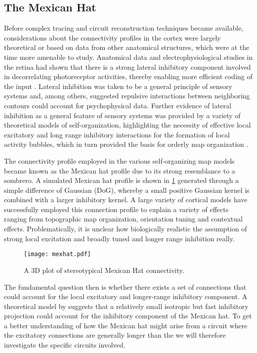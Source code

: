 \subsection{The Mexican Hat} \label{MexicanHat}


Before complex tracing and circuit reconstruction techniques became
available, considerations about the connectivity profiles in the
cortex were largely theoretical or based on data from other anatomical
structures, which were at the time more amenable to study. Anatomical
data and electrophysiological studies in the retina had shown that
there is a strong lateral inhibitory component involved in
decorrelating photoreceptor activities, thereby enabling more
efficient coding of the input \citep{Atick1992}. Lateral inhibition
was taken to be a general principle of sensory systems and, among
others, \cite{Blakemore1970} suggested repulsive interactions between
neighboring contours could account for psychophysical data. Further
evidence of lateral inhibition as a general feature of sensory systems
was provided by a variety of theoretical models of self-organization,
highlighting the necessity of effective local excitatory and long
range inhibitory interactions for the formation of local activity
bubbles, which in turn provided the basis for orderly map organization
\citep{VonderMalsburg1973,Miller1989}.

The connectivity profile employed in the various self-organizing map
models became known as the Mexican hat profile due to its strong
resemblance to a sombrero. A simulated Mexican hat profile is shown in
\ref{MexHat} generated through a simple difference of Gaussian (DoG),
whereby a small positive Gaussian kernel is combined with a larger
inhibitory kernel. A large variety of cortical models have
successfully employed this connection profile to explain a variety of
effects ranging from topographic map organization, orientation tuning
and contextual effects. Problematically, it is unclear how
biologically realistic the assumption of strong local excitation and
broadly tuned and longer range inhibition really.

\begin{figure}
	\centering \texttt{[image: mexhat.pdf]}
	\caption{A 3D plot of stereotypical Mexican Hat connectivity.}
	\label{MexHat}
\end{figure}

The fundamental question then is whether there exists a set of
connections that could account for the local excitatory and
longer-range inhibitory component. A theoretical model by
\cite{Kang2003} suggests that a relatively small isotropic but fast
inhibitory projection could account for the inhibitory component of
the Mexican hat. To get a better understanding of how the Mexican hat
might arise from a circuit where the excitatory connections are
generally longer than the we will therefore investigate the specific
circuits involved.

